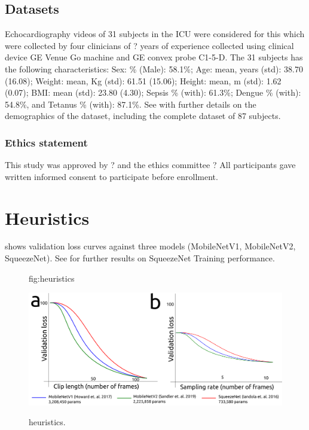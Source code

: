 \documentclass[mlabstract,twocolumn]{jmlr}
\begin{document}
\subsection{Datasets}
Echocardiography videos of 31 subjects in the ICU were considered for this which were collected by four clinicians of ? years of experience collected using clinical device GE Venue Go machine and GE convex probe C1-5-D.
The 31 subjects has the following characteristics:
Sex: \% (Male): 58.1\%;
Age: mean, years (std): 38.70 (16.08);
Weight: mean, Kg (std): 61.51 (15.06);
Height: mean, m (std): 1.62 (0.07);
BMI: mean (std): 23.80 (4.30);
Sepsis \% (with): 61.3\%;
Dengue \% (with): 54.8\%, and
Tetanus \% (with): 87.1\%.
See  with further details on the demographics of the dataset, including the complete dataset of 87 subjects.

\subsubsection{Ethics statement}
This study was approved by ? and the ethics committee ?
All participants gave written informed consent to participate before enrollment.

\section{Heuristics}
 shows validation loss curves against three models (MobileNetV1, MobileNetV2, SqueezeNet).
See  for further results on SqueezeNet Training performance.  

\begin{figure}[htbp]
\floatconts
  {fig:heuristics}
  {\caption{heuristics.}}
  {\includegraphics[width=\columnwidth]{../figures/heuristics/versions/drawing-v00}}%
\end{figure}
\end{document}
